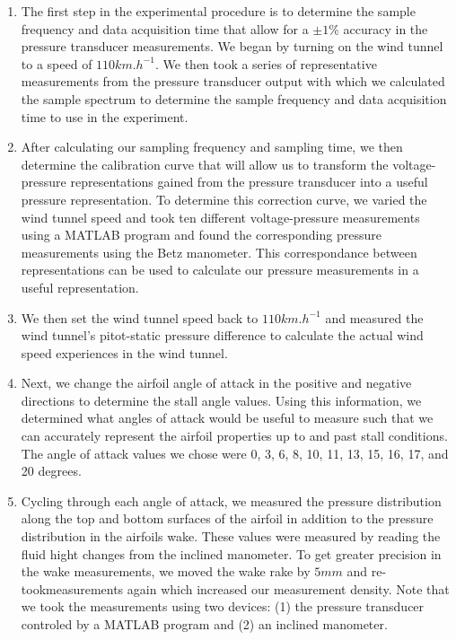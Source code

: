\documentclass[runningheads]{llncs}
\begin{document}
\begin{enumerate}

    \item The first step in the experimental procedure is to determine the sample frequency and data acquisition time that allow for a $\pm 1\%$ accuracy in the pressure transducer measurements. We began by turning on the wind tunnel to a speed of $110\si{km}.\si{h}^{-1}$. We then took a series of representative measurements from the pressure transducer output with which we calculated the sample spectrum to determine the sample frequency and data acquisition time to use in the experiment.
    
    \item After calculating our sampling frequency and sampling time, we then determine the calibration curve that will allow us to transform the voltage-pressure representations gained from the pressure transducer into a useful pressure representation. To determine this correction curve, we varied the wind tunnel speed and took ten different voltage-pressure measurements using a MATLAB program and found the corresponding pressure measurements using the Betz manometer. This correspondance between representations can be used to calculate our pressure measurements in a useful representation.
    
    \item We then set the wind tunnel speed back to $110\si{km}.\si{h}^{-1}$ and measured the wind tunnel's pitot-static pressure difference to calculate the actual wind speed experiences in the wind tunnel.
    
    \item Next, we change the airfoil angle of attack in the positive and negative directions to determine the stall angle values. Using this information, we determined what angles of attack would be useful to measure such that we can accurately represent the airfoil properties up to and past stall conditions. The angle of attack values we chose were 0, 3, 6, 8, 10, 11, 13, 15, 16, 17, and 20 degrees.

    \item Cycling through each angle of attack, we measured the pressure distribution along the top and bottom surfaces of the airfoil in addition to the pressure distribution in the airfoils wake. These values were measured by reading the fluid hight changes from the inclined manometer. To get greater precision in the wake measurements, we moved the wake rake by $5\si{mm}$ and re-tookmeasurements again which increased our measurement density. Note that we took the measurements using two devices: (1) the pressure transducer controled by a MATLAB program and (2) an inclined manometer.

\end{enumerate}
\end{document}
